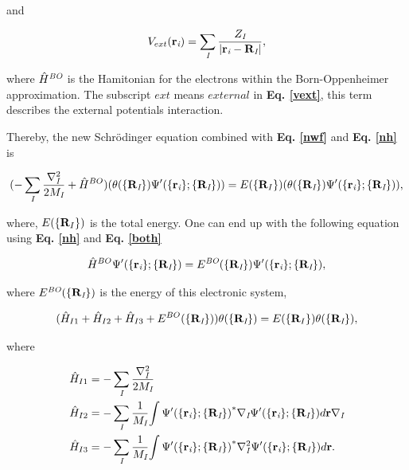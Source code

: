 \documentclass[a4paper, 12pt, titlepage,oneside,drop]{kthesis}
\begin{document}
and

\begin{equation}\label{vext}
V_{ext}(\textbf{r}_{\textit{i}}) =  \sumi<I> \frac{Z_\textit{I}}{|\textbf{r}_\textit{i}-\textbf{R}_\textit{I}|},
\end{equation}

where ${\hat{H}}^\textit{BO}$  is the Hamitonian for the electrons within the Born-Oppenheimer approximation. The subscript $ext$ means $external$ in \textbf{Eq. \ref{vext}}, this term describes the external potentials interaction. 

Thereby, the new Schrödinger equation combined with \textbf{Eq. \ref{nwf}} and \textbf{Eq. \ref{nh}} is 

\begin{equation}
 (- \sumi<I> \frac{{{\nabla}_{\textit{I}}^{2}}}{2 M_\textit{I}} + {\hath}^{BO} ) ({\theta(\{{\textbf R}_{\textit I}\})} {\Psi'(\{\textbf{r}_{\textit i}\}; \{{\textbf R}_{\textit I}\})}) = E(\{{\textbf R_I}\}) ({\theta(\{{\textbf R}_{\textit I}\})} {\Psi'(\{\textbf{r}_{\textit i}\}; \{{\textbf R}_{\textit I}\})}),
\end{equation}
 
\noindent where, $E(\{{\textbf R_I}\})$ is the total energy. One can end up with the following equation using \textbf{Eq. \ref{nh}} and \textbf{Eq. \ref{both}}

\begin{equation}\label{bose}
{\hat{H}}^{BO} {\Psi'(\{\textbf{r}_{\textit i}\}; \{{\textbf R}_{\textit I}\})} = E^\textit{BO}{(\{\textbf{R}_{\textit I}\})} {\Psi'(\{\textbf{r}_{\textit i}\}; \{{\textbf R}_{\textit I}\})},
\end{equation}

\noindent where $E^\textit{BO}{(\{\textbf{R}_{\textit I}\})}$ is the energy of this electronic system,

\begin{equation}\label{ise}
( \hat{H}_{I1}+\hat{H}_{I2}+\hat{H}_{I3}+E^{BO}(\{{\textbf R}_{\textit I}\}) ) {\theta(\{\textbf{R}_{\textit I}\})} = E(\{{\textbf R_I}\}) {\theta(\{\textbf{R}_{\textit I}\})},
\end{equation}

where

\begin{equation}\begin{split}
 &  \hat{H}_{I1} = - \sumi<I> \frac{{{\nabla}_{\textit{I}}^{2}}}{2 M_\textit{I}}   \\
 &  \hat{H}_{I2} = - \sumi<I> \frac{1}{M_\textit{I}} {\int {\Psi'(\{\textbf{r}_{\textit{i}}\}; \{\textbf{R}_{\textit I}\})}^{\ast} {{\nabla}_{\textit{I}}} {{\Psi'(\{\textbf{r}_{\textit{i}} \}; \{\textbf{R}_{\textit I}\})}} d {\textbf r }} {{\nabla}_{\textit{I}}}  \\
 &  \hat{H}_{I3} = - \sumi<I> \frac{1}{M_\textit{I}} {\int {{\Psi'(\{\textbf{r}_{\textit{i}}\}; \{\textbf{R}_{\textit I}\})}}^{\ast} {{\nabla}_{\textit{I}}^{2}} {{\Psi'(\{\textbf{r}_{\textit{i}} \}; \{\textbf{R}_{\textit I}\})}} d {\textbf r }}. 
\end{split}\end{equation}
\end{document}
